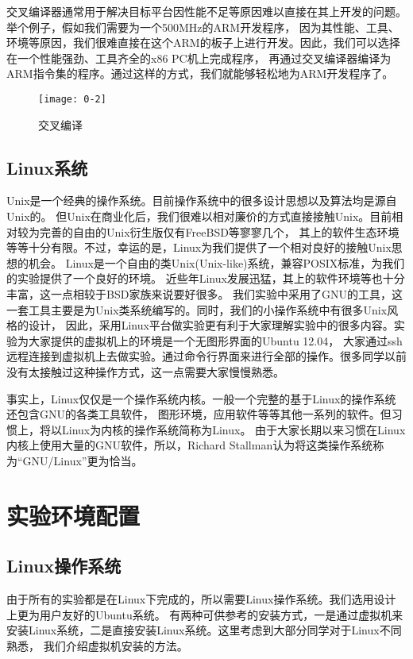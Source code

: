 交叉编译器通常用于解决目标平台因性能不足等原因难以直接在其上开发的问题。举个例子，假如我们需要为一个500MHz的ARM开发程序，
因为其性能、工具、环境等原因，我们很难直接在这个ARM的板子上进行开发。因此，我们可以选择在一个性能强劲、工具齐全的x86 PC机上完成程序，
再通过交叉编译器编译为ARM指令集的程序。通过这样的方式，我们就能够轻松地为ARM开发程序了。

\begin{figure}[htbp]
  \centering
  \texttt{[image: 0-2]}
  \caption{交叉编译}\label{fig:0-2}
\end{figure}

\subsection{Linux系统}
Unix是一个经典的操作系统。目前操作系统中的很多设计思想以及算法均是源自Unix的。
但Unix在商业化后，我们很难以相对廉价的方式直接接触Unix。目前相对较为完善的自由的Unix衍生版仅有FreeBSD等寥寥几个，
其上的软件生态环境等等十分有限。不过，幸运的是，Linux为我们提供了一个相对良好的接触Unix思想的机会。
Linux是一个自由的类Unix(Unix-like)系统，兼容POSIX标准，为我们的实验提供了一个良好的环境。
近些年Linux发展迅猛，其上的软件环境等也十分丰富，这一点相较于BSD家族来说要好很多。
我们实验中采用了GNU的工具，这一套工具主要是为Unix类系统编写的。同时，我们的小操作系统中有很多Unix风格的设计，
因此，采用Linux平台做实验更有利于大家理解实验中的很多内容。实验为大家提供的虚拟机上的环境是一个无图形界面的Ubuntu 12.04，
大家通过ssh远程连接到虚拟机上去做实验。通过命令行界面来进行全部的操作。很多同学以前没有太接触过这种操作方式，这一点需要大家慢慢熟悉。

\begin{note}
事实上，Linux仅仅是一个操作系统内核。一般一个完整的基于Linux的操作系统还包含GNU的各类工具软件，
图形环境，应用软件等等其他一系列的软件。但习惯上，将以Linux为内核的操作系统简称为Linux。
由于大家长期以来习惯在Linux内核上使用大量的GNU软件，所以，Richard Stallman认为将这类操作系统称为“GNU/Linux”更为恰当。
\end{note}

\section{实验环境配置}

\subsection{Linux操作系统}
由于所有的实验都是在Linux下完成的，所以需要Linux操作系统。我们选用设计上更为用户友好的Ubuntu系统。
有两种可供参考的安装方式，一是通过虚拟机来安装Linux系统，二是直接安装Linux系统。这里考虑到大部分同学对于Linux不同熟悉，
我们介绍虚拟机安装的方法。

